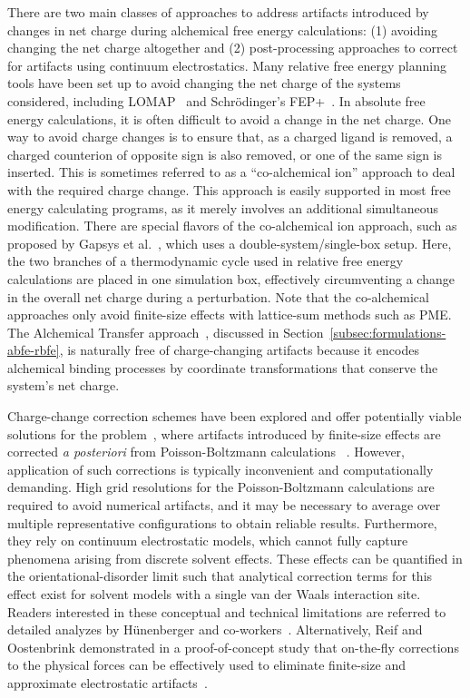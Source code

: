 \documentclass[9pt,bestpractices]{livecoms}
\begin{document}
There are two main classes of approaches to address artifacts introduced by changes in net charge during alchemical free energy calculations: (1) avoiding changing the net charge altogether and (2) post-processing approaches to correct for artifacts using continuum electrostatics.
Many relative free energy planning tools have been set up to avoid changing the net charge of the systems considered, including LOMAP~\cite{liu2013lead} and Schr\"{o}dinger's FEP+~\cite{wang2015accurate}. In absolute free energy calculations, it is often difficult to avoid a change in the net charge. One way to avoid charge changes is to ensure that, as a charged ligand is removed, a charged counterion of opposite sign is also removed, or one of the same sign is inserted. This is sometimes referred to as a “co-alchemical ion” approach to deal with the required charge change. This approach is easily supported in most free energy calculating programs, as it merely involves an additional simultaneous modification.
There are special flavors of the co-alchemical ion approach, such as proposed by Gapsys et al.~\cite{gapsys2015calculation}, which uses a double-system/single-box setup. Here, the two branches of a thermodynamic cycle used in relative free energy calculations are placed in one simulation box, effectively circumventing a change in the overall net charge during a perturbation. 
Note that the co-alchemical approaches only avoid finite-size effects with lattice-sum methods such as PME.
The Alchemical Transfer approach~\cite{wu2021alchemical,azimi2022relative}, discussed in Section~\ref{subsec:formulations-abfe-rbfe}, is naturally free of charge-changing artifacts because it encodes alchemical binding processes by coordinate transformations that conserve the system's net charge.

Charge-change correction schemes have been explored and offer potentially viable solutions for the problem~\cite{mey2018impact}, where artifacts introduced by finite-size effects are corrected \textit{a posteriori} from Poisson-Boltzmann calculations ~\cite{chen2018accurate, ohlknecht2020correcting, rocklin2013calculating,Reif2014chargecorrection}. However, application of such corrections is typically inconvenient and computationally demanding. High grid resolutions for the Poisson-Boltzmann calculations are required to avoid numerical artifacts, and it may be necessary to average over multiple representative configurations to obtain reliable results. Furthermore, they rely on continuum electrostatic models, which cannot fully capture phenomena arising from discrete solvent effects. These effects can be quantified in the orientational-disorder limit such that analytical correction terms for this effect exist for solvent models with a single van der Waals interaction site. Readers interested in these conceptual and technical limitations are referred to detailed analyzes by H\"{u}nenberger and co-workers~\cite{kastenholz2006solvfe, rocklin2013calculating}.
Alternatively, Reif and Oostenbrink demonstrated in a proof-of-concept study that on-the-fly corrections to the physical forces can be effectively used to eliminate finite-size and approximate electrostatic artifacts~\cite{Reif2015onthefly}.
\end{document}
